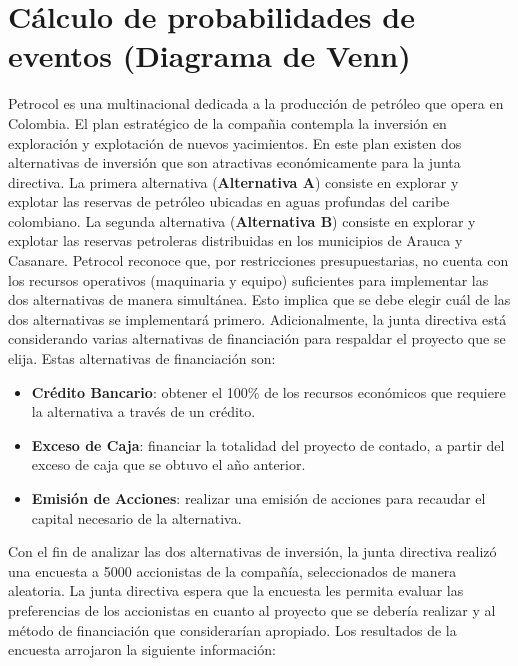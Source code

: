 \documentclass[11pt, spanish]{article}
\begin{document}
\section{Cálculo de probabilidades de eventos (Diagrama de Venn)}

Petrocol es una multinacional dedicada a la producción de petróleo que opera en Colombia. El plan estratégico de la compañia contempla la inversión en exploración y explotación de nuevos yacimientos. En este plan existen dos alternativas de inversión que son atractivas económicamente para la junta directiva. La primera alternativa (\textbf{Alternativa A}) consiste en explorar y explotar las reservas de petróleo ubicadas en aguas profundas del caribe colombiano. La segunda alternativa (\textbf{Alternativa B}) consiste en explorar y explotar las reservas petroleras distribuidas en los municipios de Arauca y Casanare. Petrocol reconoce que, por restricciones presupuestarias, no cuenta con los recursos operativos (maquinaria y equipo) suficientes para implementar las dos alternativas de manera simultánea. Esto implica que se debe elegir cuál de las dos alternativas se implementará primero. Adicionalmente, la junta directiva está considerando varias alternativas de financiación para respaldar el proyecto que se elija. Estas alternativas de financiación son:

\begin{itemize}
\item \textbf{Crédito Bancario}: obtener el 100\% de los recursos económicos que requiere la alternativa a través de un crédito.
\item \textbf{Exceso de Caja}: financiar la totalidad del proyecto de contado, a partir del exceso de caja que se obtuvo el año anterior.
\item \textbf{Emisión de Acciones}: realizar una emisión de acciones para recaudar el capital necesario de la alternativa.
\end{itemize}

Con el fin de analizar las dos alternativas de inversión, la junta directiva realizó una encuesta a 5000 accionistas de la compañía, seleccionados de manera aleatoria. La junta directiva espera que la encuesta les permita evaluar las preferencias de los accionistas en cuanto al proyecto que se debería realizar y al método de financiación que considerarían apropiado. Los resultados de la encuesta arrojaron la siguiente información:
\end{document}
